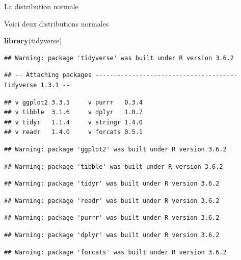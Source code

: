 \documentclass[ignorenonframetext,]{beamer}
\newenvironment{Shaded}{\begin{snugshade}}{\end{snugshade}}
\newcommand{\KeywordTok}[1]{\textcolor[rgb]{0.13,0.29,0.53}{\textbf{#1}}}
\newcommand{\NormalTok}[1]{#1}
\begin{document}
\begin{frame}[fragile]{La distribution normale}

Voici deux distributions normales

\begin{Shaded}
\begin{Highlighting}[]
\KeywordTok{library}\NormalTok{(tidyverse)}
\end{Highlighting}
\end{Shaded}

\begin{verbatim}
## Warning: package 'tidyverse' was built under R version 3.6.2
\end{verbatim}

\begin{verbatim}
## -- Attaching packages --------------------------------------- tidyverse 1.3.1 --
\end{verbatim}

\begin{verbatim}
## v ggplot2 3.3.5     v purrr   0.3.4
## v tibble  3.1.6     v dplyr   1.0.7
## v tidyr   1.1.4     v stringr 1.4.0
## v readr   1.4.0     v forcats 0.5.1
\end{verbatim}

\begin{verbatim}
## Warning: package 'ggplot2' was built under R version 3.6.2
\end{verbatim}

\begin{verbatim}
## Warning: package 'tibble' was built under R version 3.6.2
\end{verbatim}

\begin{verbatim}
## Warning: package 'tidyr' was built under R version 3.6.2
\end{verbatim}

\begin{verbatim}
## Warning: package 'readr' was built under R version 3.6.2
\end{verbatim}

\begin{verbatim}
## Warning: package 'purrr' was built under R version 3.6.2
\end{verbatim}

\begin{verbatim}
## Warning: package 'dplyr' was built under R version 3.6.2
\end{verbatim}

\begin{verbatim}
## Warning: package 'forcats' was built under R version 3.6.2
\end{verbatim}


\end{frame}
\end{document}
